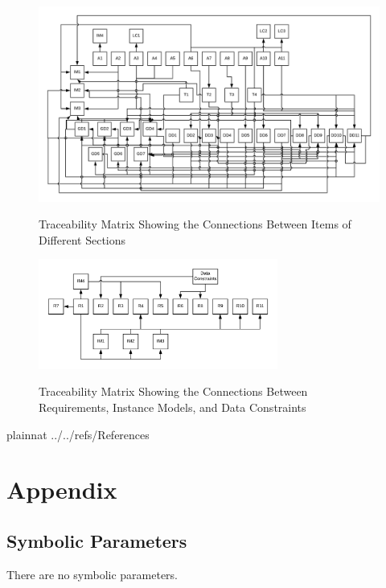 \documentclass[12pt]{article}
\begin{document}
\begin{figure}[h!]
	\begin{center}
		{
			\includegraphics[width=\textwidth]{ATrace.png}
		}
		\caption{\label{Fig_ATrace} Traceability Matrix Showing the Connections 
		Between Items of Different Sections}
	\end{center}
\end{figure}


\begin{figure}[h!]
	\begin{center}
		{
			\includegraphics[width=0.7\textwidth]{RTrace.png}
		}
		\caption{\label{Fig_RTrace} Traceability Matrix Showing the Connections 
		Between Requirements, Instance Models, and Data Constraints}
	\end{center}
\end{figure}

\newpage

 {plainnat}
 {../../refs/References}

\section{Appendix}

\subsection{Symbolic Parameters}
There are no symbolic parameters.
\end{document}
